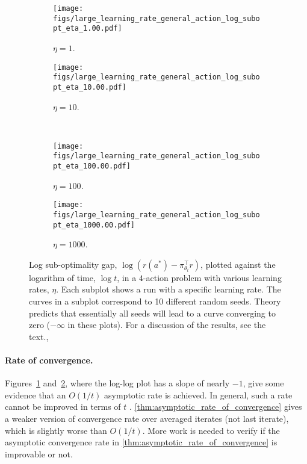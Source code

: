 \begin{figure}
\centering
\begin{subfigure}[b]{.39\linewidth}
\texttt{[image: figs/large\_learning\_rate\_general\_action\_log\_subopt\_eta\_1.00.pdf]}
\caption{$\eta = 1$.}\label{fig::sub_optimality_gap_general_action_case_eta_1}
\end{subfigure}
\begin{subfigure}[b]{.39\linewidth}
\texttt{[image: figs/large\_learning\_rate\_general\_action\_log\_subopt\_eta\_10.00.pdf]}
\caption{$\eta = 10$.}\label{fig::sub_optimality_gap_general_action_case_eta_10}
\end{subfigure}\\
\begin{subfigure}[b]{.39\linewidth}
\texttt{[image: figs/large\_learning\_rate\_general\_action\_log\_subopt\_eta\_100.00.pdf]}
\caption{$\eta = 100$.}\label{fig::sub_optimality_gap_general_action_case_eta_100}
\end{subfigure}
\begin{subfigure}[b]{.39\linewidth}
\texttt{[image: figs/large\_learning\_rate\_general\_action\_log\_subopt\_eta\_1000.00.pdf]}
\caption{$\eta = 1000$.}\label{fig::sub_optimality_gap_general_action_case_eta_1000}
\end{subfigure}
\caption{
Log sub-optimality gap, 
$\log{ (r(a^*) - \pi_{\theta_t}^\top r) } $, plotted against the logarithm of time,  $\log{t}$, in a $4$-action problem with various learning rates, $\eta$. 
Each subplot shows a run with a specific learning rate. The curves in a subplot correspond to 10 different random seeds. Theory predicts that essentially all seeds will lead to a curve converging to zero ($-\infty$ in these plots). For a discussion of the results, see the text.,
}
\label{fig:visualization_general_action_case}
\vspace{-10pt}
\end{figure}
\paragraph{Rate of convergence.} Figures~\ref{fig::sub_optimality_gap_general_action_case_eta_1} and~\ref{fig::sub_optimality_gap_general_action_case_eta_10}, where the log-log plot has a slope of nearly $-1$, give some evidence that an $O(1/t)$ asymptotic rate is achieved. In general, such a rate cannot be improved in terms of $t$ \citep{lai1985asymptotically}. \cref{thm:asymptotic_rate_of_convergence} gives a weaker version of convergence rate over averaged iterates (not last iterate), which is slightly worse than $O(1/t)$. More work is needed to verify if the asymptotic convergence rate in \cref{thm:asymptotic_rate_of_convergence} is improvable or not. 

